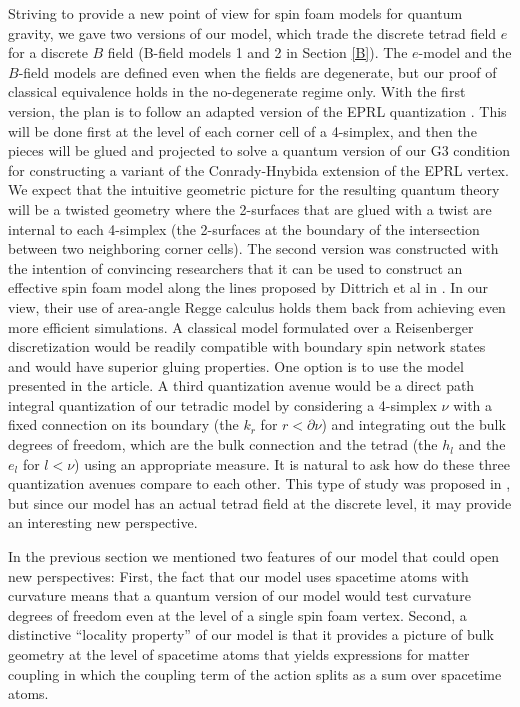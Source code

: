 \documentclass{article}
\begin{document}
Striving to provide a new point of view for spin foam models for quantum gravity, we gave two versions of our model, which trade the discrete tetrad field $e$ for a discrete $B$ field (B-field models 1 and 2 in Section \ref{B}). 
The $e$-model and the $B$-field models are defined even when the fields are degenerate, but our proof of classical equivalence holds in the no-degenerate regime only. 
With the first version, the plan is to follow an adapted version of the EPRL quantization \cite{EPRL}. This will be done first at the level of each corner cell of a 4-simplex, and then the pieces will be glued and projected to solve a quantum version of our G3 condition for constructing a variant of the Conrady-Hnybida extension \cite{Con-Hny} of the EPRL vertex. We expect that the intuitive geometric picture for the resulting quantum theory will be a twisted geometry where the 2-surfaces that are glued with a twist are internal to each 4-simplex (the 2-surfaces at the boundary of the intersection between two neighboring corner cells). 
The second version was constructed with the intention of convincing researchers that it can be used to construct an effective spin foam model along the lines proposed by Dittrich et al in \cite{ESFM1}. 
In our view, their use of area-angle Regge calculus holds them back from achieving even more efficient simulations. A classical model formulated over a Reisenberger discretization would be readily compatible with boundary spin network states and would have superior gluing properties. One option is to use the model presented in the article. 
%
A third quantization avenue would be a direct path integral quantization of our tetradic model by considering a 4-simplex $\nu$ with a fixed connection on its boundary (the $k_r$ for $r < \partial \nu$) and integrating out the bulk degrees of freedom, which are the bulk connection and the tetrad (the $h_l$ and the $e_l$ for $l < \nu$) using an appropriate measure. 
It is natural to ask how do these three quantization avenues compare to each other. This type of study was proposed in \cite{Engle-Thiemann-Han}, but since our model has an actual tetrad field at the discrete level, it may provide an interesting new perspective. 

In the previous section we mentioned two features of our model that could open new perspectives: 
First, the fact that our model uses spacetime atoms with curvature means that a quantum version of our model would test curvature degrees of freedom even at the level of a single spin foam vertex. 
Second, a distinctive ``locality property'' of our model is that it provides a picture of bulk geometry at the level of spacetime atoms that yields expressions for matter coupling in which the coupling term of the action splits as a sum over spacetime atoms. 
\end{document}
